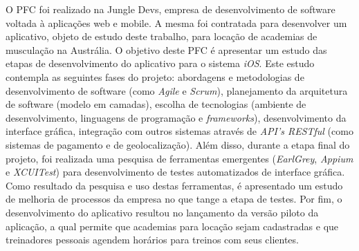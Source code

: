 

\setlength{\absparsep}{18pt} %
\begin{resumo}

O PFC foi realizado na Jungle Devs, empresa de desenvolvimento de software voltada à aplicações web e mobile. A mesma foi contratada para desenvolver um aplicativo, objeto de estudo deste trabalho, para locação de academias de musculação na Austrália. O objetivo deste PFC é apresentar um estudo das etapas de desenvolvimento do aplicativo para o sistema \textit{iOS}. Este estudo contempla as seguintes fases do projeto: abordagens e metodologias de desenvolvimento de software (como \textit{Agile} e \textit{Scrum}), planejamento da arquitetura de software (modelo em camadas), escolha de tecnologias (ambiente de desenvolvimento, linguagens de programação e \textit{frameworks}), desenvolvimento da interface gráfica, integração com outros sistemas através de \textit{API's RESTful} (como sistemas de pagamento e de geolocalização). Além disso, durante a etapa final do projeto, foi realizada uma pesquisa de ferramentas emergentes (\textit{EarlGrey}, \textit{Appium} e \textit{XCUITest}) para desenvolvimento de testes automatizados de interface gráfica. Como resultado da pesquisa e uso destas ferramentas, é apresentado um estudo de melhoria de processos da empresa no que tange a etapa de testes. Por fim, o desenvolvimento do aplicativo resultou no lançamento da versão piloto da aplicação, a qual permite que academias para locação sejam cadastradas e que treinadores pessoais agendem horários para treinos com seus clientes.

\end{resumo}


